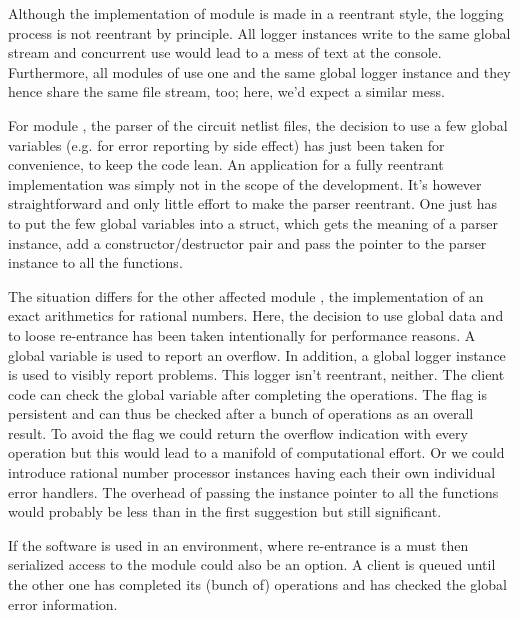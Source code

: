Although the implementation of module  is made in a reentrant
style, the logging process is not reentrant by principle. All logger
instances write to the same global stream  and concurrent
use would lead to a mess of text at the console. Furthermore, all modules
of \linnet{} use one and the same global logger instance and they hence
share the same file stream, too; here, we'd expect a similar mess.

For module , the parser of the circuit netlist
files, the decision to use a few global variables (e.g. for error
reporting by side effect) has just been taken for convenience, to keep the
code lean. An application for a fully reentrant implementation was simply
not in the scope of the development. It's however straightforward and only
little effort to make the parser reentrant. One just has to put the few
global variables into a struct, which gets the meaning of a parser
instance, add a constructor/destructor pair and pass the pointer to the
parser instance to all the functions.

The situation differs for the other affected module
, the implementation of an exact arithmetics
for rational numbers. Here, the decision to use global data and to loose
re-entrance has been taken intentionally for performance reasons. A global
variable is used to report an overflow. In addition, a global logger
instance is used to visibly report problems. This logger isn't reentrant,
neither. The client code can check the global variable after completing
the operations. The flag is persistent and can thus be checked after a
bunch of operations as an overall result. To avoid the flag we could
return the overflow indication with every operation but this would lead to
a manifold of computational effort. Or we could introduce rational number
processor instances having each their own individual error handlers. The
overhead of passing the instance pointer to all the functions would
probably be less than in the first suggestion but still significant.

If the software is used in an environment, where re-entrance is a must then
serialized access to the module could also be an option. A client is
queued until the other one has completed its (bunch of) operations and has
checked the global error information.